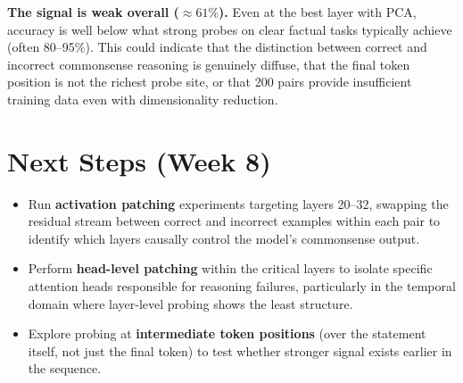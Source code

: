 \documentclass[11pt]{article}
\begin{document}
\textbf{The signal is weak overall (${\approx}61\%$).} Even at the best layer with PCA, accuracy is well below what strong probes on clear factual tasks typically achieve (often 80--95\%). This could indicate that the distinction between correct and incorrect commonsense reasoning is genuinely diffuse, that the final token position is not the richest probe site, or that 200 pairs provide insufficient training data even with dimensionality reduction.

\section*{Next Steps (Week 8)}

\begin{itemize}[leftmargin=2em]
\item Run \textbf{activation patching} experiments targeting layers 20--32, swapping the residual stream between correct and incorrect examples within each pair to identify which layers causally control the model's commonsense output.
\item Perform \textbf{head-level patching} within the critical layers to isolate specific attention heads responsible for reasoning failures, particularly in the temporal domain where layer-level probing shows the least structure.
\item Explore probing at \textbf{intermediate token positions} (over the statement itself, not just the final token) to test whether stronger signal exists earlier in the sequence.
\end{itemize}
\end{document}
